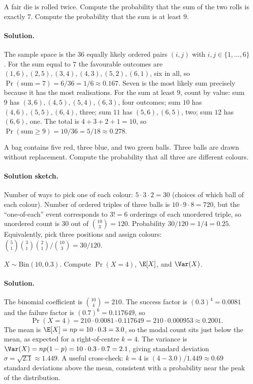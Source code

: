 \begin{exercise}
A fair die is rolled twice. Compute the probability that the sum
of the two rolls is exactly $7$. Compute the probability that the
sum is at least $9$.
\end{exercise}

\paragraph{Solution.}
The sample space is the $36$ equally likely ordered pairs $(i, j)$
with $i, j \in \{1, \ldots, 6\}$. For the sum equal to $7$ the
favourable outcomes are $(1,6), (2,5), (3,4), (4,3), (5,2), (6,1)$,
six in all, so $\Pr(\text{sum} = 7) = 6/36 = 1/6 \approx 0.167$.
Seven is the most likely sum precisely because it has the most
realisations. For the sum at least $9$, count by value: sum $9$ has
$(3,6),(4,5),(5,4),(6,3)$, four outcomes; sum $10$ has
$(4,6),(5,5),(6,4)$, three; sum $11$ has $(5,6),(6,5)$, two; sum
$12$ has $(6,6)$, one. The total is $4 + 3 + 2 + 1 = 10$, so
$\Pr(\text{sum} \geq 9) = 10/36 = 5/18 \approx 0.278$.

\begin{exercise}
A bag contains five red, three blue, and two green balls. Three
balls are drawn without replacement. Compute the probability that
all three are different colours.
\end{exercise}

\paragraph{Solution sketch.}
Number of ways to pick one of each colour: $5 \cdot 3 \cdot 2 = 30$
(choices of which ball of each colour). Number of ordered triples
of three balls is $10 \cdot 9 \cdot 8 = 720$, but the
``one-of-each'' event corresponds to $3! = 6$ orderings of each
unordered triple, so unordered count is $30$ out of $\binom{10}{3}
= 120$. Probability $30/120 = 1/4 = 0.25$. Equivalently, pick three
positions and assign colours: $\binom{5}{1}\binom{3}{1}\binom{2}{1}
/ \binom{10}{3} = 30/120$.

\begin{exercise}
$X \sim \mathrm{Bin}(10, 0.3)$. Compute $\Pr(X = 4)$, $\E[X]$, and
$\Var(X)$.
\end{exercise}

\paragraph{Solution.}
The binomial coefficient is $\binom{10}{4} = 210$. The success
factor is $(0.3)^{4} = 0.0081$ and the failure factor is
$(0.7)^{6} = 0.117649$, so
\[
\Pr(X = 4) = 210 \cdot 0.0081 \cdot 0.117649
= 210 \cdot 0.000953 \approx 0.2001.
\]
The mean is $\E[X] = np = 10 \cdot 0.3 = 3.0$, so the modal count
sits just below the mean, as expected for a right-of-centre $k = 4$.
The variance is $\Var(X) = np(1 - p) = 10 \cdot 0.3 \cdot 0.7 =
2.1$, giving standard deviation $\sigma = \sqrt{2.1} \approx 1.449$.
A useful cross-check: $k = 4$ is $(4 - 3.0)/1.449 \approx 0.69$
standard deviations above the mean, consistent with a probability
near the peak of the distribution.

